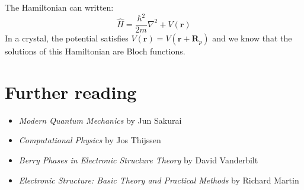 \documentclass[prb,aps,11pt,superscriptaddress,floatfix]{revtex4-2}
\begin{document}
The Hamiltonian can written:
\begin{equation}
  \hat{H}=  \frac{\hbar^2}{2m} \nabla^2 + V(\pmb{r})
\end{equation}
In a crystal, the potential satisfies $V(\pmb{r})=V(\pmb{r}+\pmb{R}_p)$ and we know that the solutions of this Hamiltonian are Bloch functions.



\section{Further reading}

\begin{itemize}
  \item \emph{Modern Quantum Mechanics} by Jun Sakurai
  \item \emph{Computational Physics} by Jos Thijssen
  \item \emph{Berry Phases in Electronic Structure Theory} by David Vanderbilt
  \item \emph{Electronic Structure: Basic Theory and Practical Methods} by Richard Martin
\end{itemize}




\end{document}
